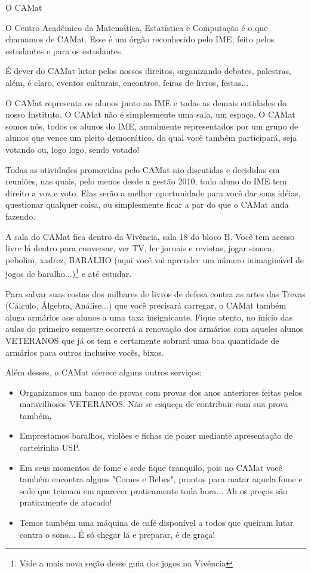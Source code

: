 \begin{secao}{O CAMat}

O Centro Acadêmico da Matemática, Estatística e Computação é o que chamamos de
CAMat. Esse é um órgão reconhecido pelo IME, feito pelos estudantes e para os
estudantes.

É dever do CAMat lutar pelos nossos direitos, organizando debates, palestras,
além, é claro, eventos culturais, encontros, feiras de livros, festas...

O CAMat representa os alunos junto ao IME e todas as demais entidades do nosso
Instituto. O CAMat não é simplesmente uma sala, um espaço. O CAMat somos nós,
todos os alunos do IME, anualmente representados por um grupo de alunos que
vence um pleito democrático, do qual você também participará, seja votando ou,
logo logo, sendo votado!

Todas as atividades promovidas pelo CAMat são discutidas e decididas em
reuniões, nas quais, pelo menos desde a gestão 2010, todo aluno do IME tem
direito a voz e voto. Elas serão a melhor oportunidade para você dar suas
idéias, questionar qualquer coisa, ou simplesmente ficar a par do que o CAMat
anda fazendo.

A sala do CAMat  fica dentro da Vivência, sala 18 do bloco B. Você tem acesso
livre lá dentro para conversar, ver TV, ler jornais e revistas, jogar sinuca,
pebolim, xadrez, BARALHO (aqui você vai aprender um número inimaginável de
jogos de baralho...)\footnote{Vide a mais nova seção desse guia dos jogos na
Vivência} e até estudar.

Para salvar suas costas dos milhares de livros de defesa contra as artes das
Trevas (Cálculo, Álgebra, Análise...) que você precisará carregar, o CAMat
também aluga armários aos alunos a uma taxa insignicante. Fique atento, no
início das aulas do primeiro semestre ocorrerá a renovação dos armários com
aqueles alunos VETERANOS que já os tem e certamente sobrará uma boa quantidade
de armários para outros inclusive vocês, bixos.

Além desses, o CAMat oferece alguns outros serviços:

\begin{itemize}
\item Organizamos um banco de provas com provas dos anos anteriores feitas
pelos maravilhosos VETERANOS. Não se esqueça de contribuir com sua prova também.
\item Emprestamos baralhos, violões e fichas de poker mediante apresentação de
carteirinha USP.
\item Em seus momentos de fome e sede fique tranquilo, pois no CAMat você
também encontra alguns "Comes e Bebes", prontos para matar aquela fome e sede
que teimam em aparecer praticamente toda hora... Ah os preços são praticamente
de atacado!
\item Temos também uma máquina de café disponível a todos que queiram lutar
contra o sono... É só chegar lá e preparar, é de graça!
\end{itemize}


\end{secao}
